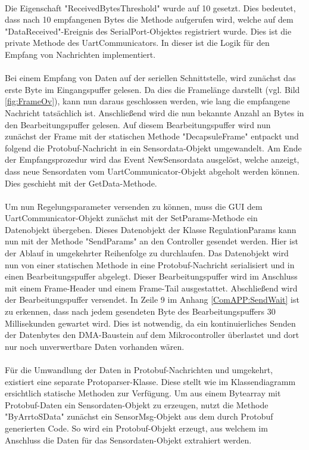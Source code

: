 \paragraph{}
Die Eigenschaft "ReceivedBytesThreshold" wurde auf 10 gesetzt. Dies bedeutet, dass nach 10 empfangenen Bytes die Methode aufgerufen wird, welche auf dem "DataReceived"-Ereignis des SerialPort-Objektes registriert wurde. Dies ist die private Methode des UartCommunicators. In dieser ist die Logik für den Empfang von Nachrichten implementiert.
\paragraph{}
Bei einem Empfang von Daten auf der seriellen Schnittstelle, wird zunächst das erste Byte im Eingangspuffer gelesen. Da dies die Framelänge darstellt (vgl. Bild \ref{fig:FrameOv}), kann nun daraus geschlossen werden, wie lang die empfangene Nachricht tatsächlich ist. Anschließend wird die nun bekannte Anzahl an Bytes in den Bearbeitungspuffer gelesen. Auf diesem Bearbeitungspuffer wird nun zunächst der Frame mit der statischen Methode "DecapsuleFrame" entpackt und folgend die Protobuf-Nachricht in ein Sensordata-Objekt umgewandelt. Am Ende der Empfangsprozedur wird das Event NewSensordata ausgelöst, welche anzeigt, dass neue Sensordaten vom UartCommunicator-Objekt abgeholt werden können. Dies geschieht mit der GetData-Methode.
\paragraph{}
Um nun Regelungsparameter versenden zu können, muss die GUI dem UartCommunicator-Objekt zunächst mit der SetParams-Methode ein Datenobjekt übergeben. Dieses Datenobjekt der Klasse RegulationParams kann nun mit der Methode "SendParams" an den Controller gesendet werden. Hier ist der Ablauf in umgekehrter Reihenfolge zu durchlaufen. Das Datenobjekt wird nun von einer statischen Methode in eine Protobuf-Nachricht serialisiert und in einen Bearbeitungspuffer abgelegt. Dieser Bearbeitungspuffer wird im Anschluss mit einem Frame-Header und einem Frame-Tail ausgestattet. Abschließend wird der Bearbeitungspuffer versendet. In Zeile 9 im Anhang \ref{ComAPP:SendWait} ist zu erkennen, dass nach jedem gesendeten Byte des Bearbeitungspuffers 30 Millisekunden gewartet wird. Dies ist notwendig, da ein kontinuierliches Senden der Datenbytes den DMA-Baustein auf dem Mikrocontroller überlastet und dort nur noch unverwertbare Daten vorhanden wären.
\paragraph{}
Für die Umwandlung der Daten in Protobuf-Nachrichten und umgekehrt, existiert eine separate Protoparser-Klasse. Diese stellt wie im Klassendiagramm ersichtlich statische Methoden zur Verfügung. Um aus einem Bytearray mit Protobuf-Daten ein Sensordaten-Objekt zu erzeugen, nutzt die Methode "ByArrtoSData" zunächst ein SensorMsg-Objekt aus dem durch Protobuf generierten Code. So wird ein Protobuf-Objekt erzeugt, aus welchem im Anschluss die Daten für das Sensordaten-Objekt extrahiert werden.
